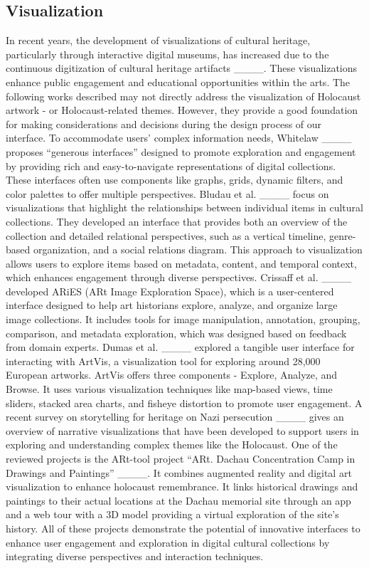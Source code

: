 \subsection{Visualization}
In recent years, the development of visualizations of cultural heritage, particularly through interactive digital museums, has increased due to the continuous digitization of cultural heritage artifacts ____. These visualizations enhance public engagement and educational opportunities within the arts. The following works described may not directly address the visualization of Holocaust artwork - or Holocaust-related themes. However, they provide a good foundation for making considerations and decisions during the design process of our interface.
To accommodate users’ complex information needs, Whitelaw ____ proposes “generous interfaces” designed to promote exploration and engagement by providing rich and easy-to-navigate representations of digital collections. These interfaces often use components like graphs, grids, dynamic filters, and color palettes to offer multiple perspectives.
Bludau et al. ____ focus on visualizations that highlight the relationships between individual items in cultural collections. They developed an interface that provides both an overview of the collection and detailed relational perspectives, such as a vertical timeline, genre-based organization, and a social relations diagram. This approach to visualization allows users to explore items based on metadata, content, and temporal context, which enhances engagement through diverse perspectives.
Crissaff et al. ____ developed ARiES (ARt Image Exploration Space), which is a user-centered interface designed to help art historians explore, analyze, and organize large image collections. It includes tools for image manipulation, annotation, grouping, comparison, and metadata exploration, which was designed based on feedback from domain experts. 
Dumas et al. ____ explored a tangible user interface for interacting with ArtVis, a visualization tool for exploring around 28,000 European artworks. ArtVis offers three components - Explore, Analyze, and Browse. It uses various visualization techniques like map-based views, time sliders, stacked area charts, and fisheye distortion to promote user engagement. 
A recent survey on storytelling for heritage on Nazi persecution ____ gives an overview of narrative visualizations that have been developed to support users in exploring and understanding complex themes like the Holocaust. One of the reviewed projects is the ARt-tool project “ARt. Dachau Concentration Camp in Drawings and Paintings” ____. It combines augmented reality and digital art visualization to enhance holocaust remembrance. It links historical drawings and paintings to their actual locations at the Dachau memorial site through an app and a web tour with a 3D model providing a virtual exploration of the site’s history.
All of these projects demonstrate the potential of innovative interfaces to enhance user engagement and exploration in digital cultural collections by integrating diverse perspectives and interaction techniques.

